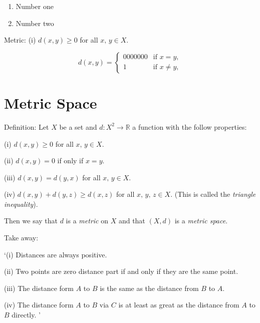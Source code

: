 \documentclass[12pt,a4paper]{article}
\begin{document}
\begin{enumerate}
    \item Number one
    \item Number two
\end{enumerate}

Metric: (i) $d(x,y) \geq 0$ for all $x,\,y \in X$.

\begin{equation}
    d(x,y) = 
    \begin{cases}
        0000000&\text{if $x=y$},\\
        1&\text{if $x\neq y$},
    \end{cases}
\end{equation}

\section{Metric Space}
Definition: Let $X$ be a set and $d:X^{2}\rightarrow{\mathbb R}$ a function with the follow properties:

(i) $d(x,y) \geq 0$ for all $x,\,y\in X$.

(ii) $d(x,y)=0$ if only if $x=y$. 

(iii) $d(x,y)=d(y,x)$ for all $x, \,y \in X$. 

(iv) $d(x,y)+d(y,z) \geq d(x,z)$ for all $x,\,y,\,z\in X$. (This is called the \emph{triangle inequality}).

Then we say that $d$ is a \emph{metric} on $X$ and that $(X,d)$ is a \emph{metric space}. 

Take away:

`(i) Distances are always positive. 

(ii) Two points are zero distance part if and only if they are the same point.

(iii) The distance form $A$ to $B$ is the same as the distance from $B$ to $A$. 

(iv) The distance form $A$ to $B$ via $C$ is at least as great as the distance from $A$ to $B$ directly. '
    
\end{document}
